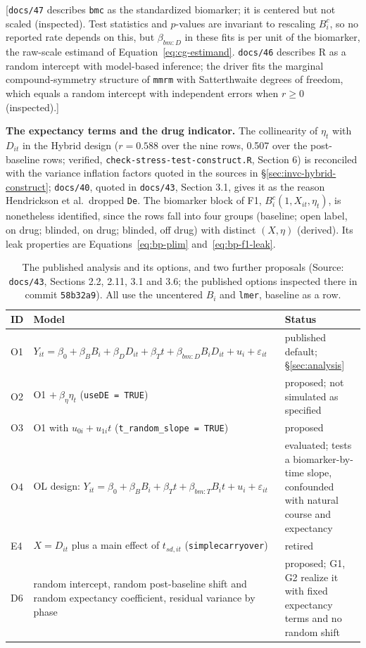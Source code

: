 \documentclass[11pt]{article}
\newcommand{\note}[1]{\textcolor{blue!60!black}{\small [#1]}}
\newcommand{\code}[1]{\texttt{#1}}
\begin{document}
\note{\code{docs/47} describes \code{bmc} as the standardized biomarker;
it is centered but not scaled (inspected). Test statistics and
$p$-values are invariant to rescaling $B^{c}_i$, so no reported rate
depends on this, but $\beta_{bm:D}$ in these fits is per unit of the
biomarker, the raw-scale estimand of Equation~\eqref{eq:cg-estimand}.
\code{docs/46} describes R as a random intercept with model-based
inference; the driver fits the marginal compound-symmetry structure of
\code{mmrm} with Satterthwaite degrees of freedom, which equals a random
intercept with independent errors when $r \ge 0$ (inspected).}

\textbf{The expectancy terms and the drug indicator.} The collinearity
of $\eta_t$ with $D_{it}$ in the Hybrid design ($r = 0.588$ over the
nine rows, 0.507 over the post-baseline rows; verified,
\code{check-stress-test-construct.R}, Section 6) is reconciled with the variance
inflation factors quoted in the sources in
\S\ref{sec:invc-hybrid-construct}; \code{docs/40}, quoted in
\code{docs/43}, Section 3.1, gives it as the reason Hendrickson et al.\
dropped \code{De}. The biomarker block of F1, $B^{c}_i(1, X_{it},
\eta_t)$, is nonetheless identified, since the rows fall into four
groups (baseline; open label, on drug; blinded, on drug; blinded, off
drug) with distinct $(X, \eta)$ (derived). Its leak properties are
Equations~\eqref{eq:bp-plim} and~\eqref{eq:bp-f1-leak}.

\begin{table}[h]
\centering\small
\caption{The published analysis and its options, and two further
proposals (Source: \code{docs/43}, Sections 2.2, 2.11, 3.1 and 3.6; the
published options inspected there in commit \code{58b32a9}). All use
the uncentered $B_i$ and \code{lmer}, baseline as a row.}
\label{tab:invd-orig-options}
\begin{tabular}{@{}lp{7.6cm}p{4.4cm}@{}}
\toprule
ID & Model & Status \\
\midrule
O1 & $Y_{it} = \beta_0 + \beta_B B_i + \beta_D D_{it} + \beta_T t +
  \beta_{bm:D} B_i D_{it} + u_i + \varepsilon_{it}$ & published default;
  \S\ref{sec:analysis} \\
O2 & O1 $+\ \beta_\eta \eta_t$ (\code{useDE = TRUE}) & proposed; not
  simulated as specified \\
O3 & O1 with $u_{0i} + u_{1i} t$ (\code{t\_random\_slope = TRUE}) &
  proposed \\
O4 & OL design: $Y_{it} = \beta_0 + \beta_B B_i + \beta_T t +
  \beta_{bm:T} B_i t + u_i + \varepsilon_{it}$ & evaluated; tests a
  biomarker-by-time slope, confounded with natural course and
  expectancy \\
E4 & $X = D_{it}$ plus a main effect of $t_{sd,it}$
  (\code{simplecarryover}) & retired \\
D6 & random intercept, random post-baseline shift and random
  expectancy coefficient, residual variance by phase & proposed; G1, G2
  realize it with fixed expectancy terms and no random shift \\
\bottomrule
\end{tabular}
\end{table}
\end{document}

